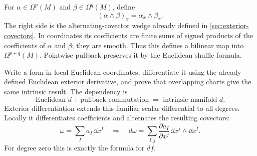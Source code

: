 For $\alpha\in\Omega^p(M)$ and $\beta\in\Omega^q(M)$, define
\[
(\alpha\wedge\beta)_x=\alpha_x\wedge\beta_x.
\]
The right side is the alternating-covector wedge already defined in
\cref{sec:exterior-covectors}. In coordinates its coefficients are finite
sums of signed products of the coefficients of $\alpha$ and $\beta$;
they are smooth. Thus this defines a bilinear map into $\Omega^{p+q}(M)$.
Pointwise pullback preserves it by the Euclidean shuffle formula.

Write a form in local Euclidean coordinates, differentiate it using the
already-defined Euclidean exterior derivative, and prove that overlapping
charts give the same intrinsic result. The dependency is
\[
\boxed{\text{Euclidean }d+\text{pullback commutation}
\ \Longrightarrow\ \text{intrinsic manifold }d.}
\]
Exterior differentiation extends this familiar scalar differential to all
degrees. Locally it differentiates coefficients and alternates the resulting
covectors:
\[
\omega=\sum_I a_I\,\dd x^I
\quad\Longrightarrow\quad
d\omega=\sum_{I,j}\frac{\partial a_I}{\partial x^j}\,\dd x^j\wedge\dd x^I.
\]
For degree zero this is exactly the formula for $df$.

